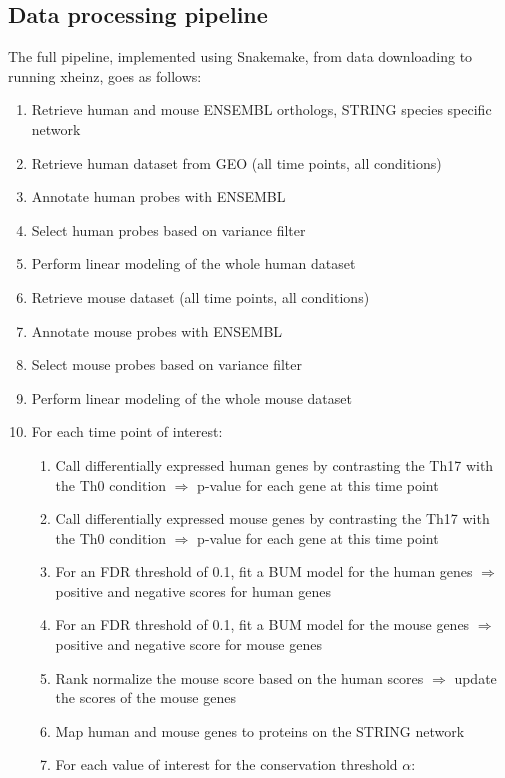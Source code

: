   \subsection{Data processing pipeline}
  The full pipeline, implemented using Snakemake, from data downloading to running xheinz, goes as follows:\pagebreak
  \begin{enumerate}
    \item Retrieve human and mouse ENSEMBL orthologs, STRING species specific network
    \item Retrieve human dataset from GEO (all time points, all conditions)
    \item Annotate human probes with ENSEMBL 
    \item Select human probes based on variance filter
    \item Perform linear modeling of the whole human dataset 
    \item Retrieve mouse dataset (all time points, all conditions)
    \item Annotate mouse probes with ENSEMBL 
    \item Select mouse probes based on variance filter
    \item Perform linear modeling of the whole mouse dataset 
    \item For each time point of interest: 
    \begin{enumerate}
      \item Call differentially expressed human genes by contrasting the Th17 with the Th0 condition $\Rightarrow$ p-value for each gene at this time point
      \item Call differentially expressed mouse genes by contrasting the Th17 with the Th0 condition $\Rightarrow$ p-value for each gene at this time point
      \item For an FDR threshold of 0.1, fit a BUM model for the human genes $\Rightarrow$ positive and negative scores for human genes
      \item For an FDR threshold of 0.1, fit a BUM model for the mouse genes $\Rightarrow$ positive and negative score for mouse genes 
      \item Rank normalize the mouse score based on the human scores $\Rightarrow$ update the scores of the mouse genes
      \item Map human and mouse genes to proteins on the STRING network
      \item For each value of interest for the conservation threshold $\alpha$:
      \begin{enumerate}

\end{enumerate}
\end{enumerate}
\end{enumerate}
